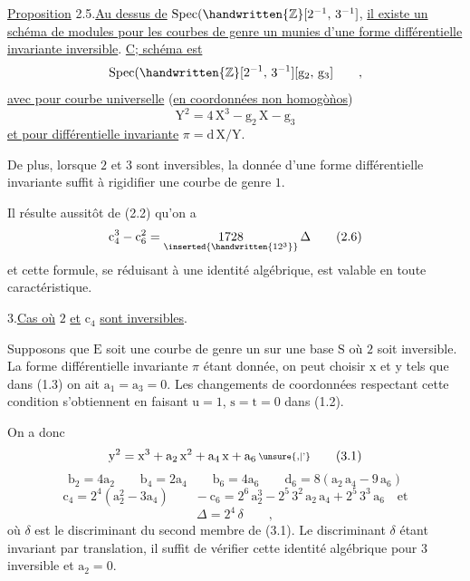 \uline{Proposition} 2.5.\quad \uline{Au dessus de} $\operatorname{Spec}(\handwritten{\mathbb{Z}}[2^{-1},\,3^{-1}]$, \uline{il existe un schéma de modules pour les courbes de genre un munies d'une forme différentielle invariante inversible}. \uline{C; schéma est}
\[
\operatorname{Spec}(\handwritten{\mathbb{Z}}[2^{-1},\,3^{-1}][\mathrm{g}_{2},\,\mathrm{g}_{3}]\qquad,
\]
\clearpage
\uline{avec pour courbe universelle} (\uline{en coordonnées non homogò\`nos})
\[
\mathrm{Y}^{2}=4\,\mathrm{X}^{3}-\mathrm{g}_{2}\,\mathrm{X}-\mathrm{g}_{3}
\]
\uline{et pour différentielle invariante} $\pi=\mathrm{d}\,\mathrm{X}/\mathrm{Y}$.

De plus, lorsque $2$ et $3$ sont inversibles, la donnée d'une forme différentielle invariante suffit à rigidifier une courbe de genre $1$.

Il résulte aussitôt de (2.2) qu'on a
\[
\mathrm{c}_{4}^{3}-\mathrm{c}_{6}^{2}=\underset{\inserted{\handwritten{12^{3}}}}{1728}\,\Delta
\tag*{(2.6)}
\]
et cette formule, se réduisant à une identité algébrique, est valable en toute caractéristique.

3.\qquad \uline{Cas où} $2$ \uline{et} $\mathrm{c}_{4}$ \uline{sont inversibles}.

Supposons que $\mathrm{E}$ soit une courbe de genre un sur une base $\mathrm{S}$ où $2$ soit inversible. La forme différentielle invariante $\pi$ étant donnée, on peut choisir $\mathrm{x}$ et $\mathrm{y}$ tels que dans (1.3) on ait $\mathrm{a}_{1}=\mathrm{a}_{3}=0$. Les changements de coordonnées respectant cette condition s'obtiennent en faisant $\mathrm{u}=1$, $\mathrm{s}=\mathrm{t}=0$ dans (1.2).

On a donc
\[
\mathrm{y}^{2}=\mathrm{x}^{3}+\mathrm{a}_{2}\,\mathrm{x}^{2}+\mathrm{a}_{4}\,\mathrm{x}+\mathrm{a}_{6}\,\raisebox{.14ex}{\scriptsize\unsure{,|'}}
\tag*{(3.1)}
\]
\[
\mathrm{b}_{2}=4\mathrm{a}_{2}\qquad\mathrm{b}_{4}=2\mathrm{a}_{4}\qquad
\mathrm{b}_{6}=4\mathrm{a}_{6}\qquad\mathrm{d}_{6}=8(\mathrm{a}_{2}\,\mathrm{a}_{4}-9\,\mathrm{a}_{6})
\]
\[
\mathrm{c}_{4}=2^{4}(\mathrm{a}_{2}^{2}-3\mathrm{a}_{4})\qquad
-\mathrm{c}_{6}=2^{6}\,\mathrm{a}_{2}^{3}-2^{5}\,3^{2}\,\mathrm{a}_{2}\,\mathrm{a}_{4}+2^{5}\,3^{3}\,\mathrm{a}_{6}\quad\text{et}
\tag*{(3.2)}
\]
\[
\Delta=2^{4}\,\delta\qquad,
\]
\clearpage
où $\delta$ est le discriminant du second membre de (3.1). Le discriminant $\delta$ étant invariant par translation, il suffit de vérifier cette identité algébrique pour $3$ inversible et $\mathrm{a}_{2}=0$.

